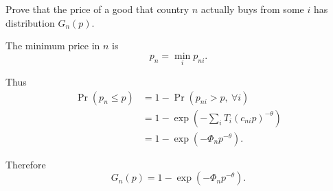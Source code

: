 
\begin{question}
Prove that the price of a good that country $n$ actually buys from some $i$ has distribution $G_n(p)$.
\end{question}

\begin{solution}
The minimum price in $n$ is
\[
p_n = \min_i p_{ni}.
\]

Thus
\begin{align*}
\Pr(p_n \leq p) 
&= 1 - \Pr(p_{ni} > p, \ \forall i) \\
&= 1 - \exp\!\left(-\sum_i T_i (c_{ni} p)^{-\theta}\right) \\
&= 1 - \exp(-\Phi_n p^{-\theta}).
\end{align*}

Therefore
\[
G_n(p) = 1 - \exp(-\Phi_n p^{-\theta}).
\]
\end{solution}

